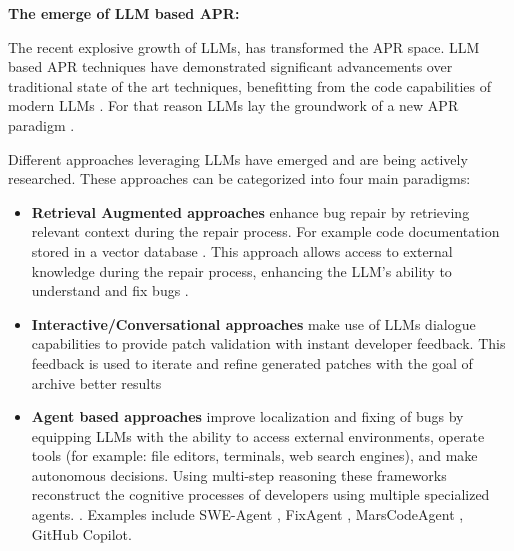 \textbf{The emerge of LLM based APR:}

The recent explosive growth of LLMs, has transformed the APR space. LLM based APR techniques have demonstrated significant advancements over traditional state of the art techniques, benefitting from the code capabilities of modern LLMs \cite{hossainDeepDiveLarge2024}. For that reason LLMs lay the groundwork of a new APR paradigm \cite{chenUnveilingPitfallsUnderstanding2025, anandComprehensiveSurveyAIDriven2024}.

Different approaches leveraging LLMs have emerged and are being actively researched. These approaches can be categorized into four main paradigms:

\begin{itemize}
    \item \textbf{Retrieval Augmented approaches} enhance bug repair by retrieving relevant context during the repair process. For example code documentation stored in a vector database \cite{puvvadiCodingAgentsComprehensive2025}. This approach allows access to external knowledge during the repair process, enhancing the LLM's ability to understand and fix bugs \cite{houLargeLanguageModels2024, yinThinkRepairSelfDirectedAutomated2024}.

    \item \textbf{Interactive/Conversational approaches} make use of LLMs dialogue capabilities to provide patch validation with instant developer feedback. \cite{xiaAutomatedProgramRepair2024, huCanGPTO1Kill2024} This feedback is used to iterate and refine generated patches with the goal of archive better results \cite{xiaAutomatedProgramRepair2024}

    \item \textbf{Agent based approaches} improve localization and fixing of bugs by equipping LLMs with the ability to access external environments, operate tools (for example: file editors, terminals, web search engines), and make autonomous decisions. \cite{anandComprehensiveSurveyAIDriven2024, puvvadiCodingAgentsComprehensive2025, mengEmpiricalStudyLLMbased2024} Using multi-step reasoning these frameworks reconstruct the cognitive processes of developers using multiple specialized agents. \cite{rondonEvaluatingAgentbasedProgram2025,zhangPATCHEmpoweringLarge2025, leeUnifiedDebuggingApproach2024}. Examples include SWE-Agent \cite{yangSWEagentAgentComputerInterfaces2024}, FixAgent \cite{leeUnifiedDebuggingApproach2024}, MarsCodeAgent \cite{liuMarsCodeAgentAInative2024}, GitHub Copilot.


\end{itemize}
